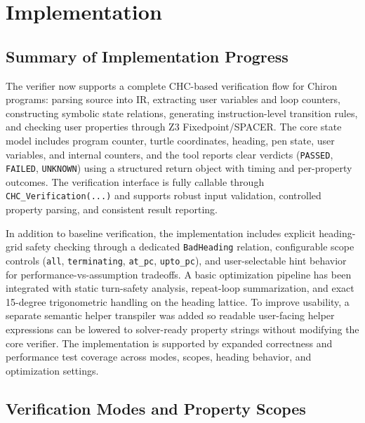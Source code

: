 \section*{Implementation}

\subsection*{Summary of Implementation Progress}
The verifier now supports a complete CHC-based verification flow for Chiron programs: parsing source into IR, extracting user variables and loop counters, constructing symbolic state relations, generating instruction-level transition rules, and checking user properties through Z3 Fixedpoint/SPACER. The core state model includes program counter, turtle coordinates, heading, pen state, user variables, and internal counters, and the tool reports clear verdicts (\texttt{PASSED}, \texttt{FAILED}, \texttt{UNKNOWN}) using a structured return object with timing and per-property outcomes. The verification interface is fully callable through \texttt{CHC\_Verification(...)} and supports robust input validation, controlled property parsing, and consistent result reporting.

In addition to baseline verification, the implementation includes explicit heading-grid safety checking through a dedicated \texttt{BadHeading} relation, configurable scope controls (\texttt{all}, \texttt{terminating}, \texttt{at\_pc}, \texttt{upto\_pc}), and user-selectable hint behavior for performance-vs-assumption tradeoffs. A basic optimization pipeline has been integrated with static turn-safety analysis, repeat-loop summarization, and exact 15-degree trigonometric handling on the heading lattice. To improve usability, a separate semantic helper transpiler was added so readable user-facing helper expressions can be lowered to solver-ready property strings without modifying the core verifier. The implementation is supported by expanded correctness and performance test coverage across modes, scopes, heading behavior, and optimization settings.

\subsection*{Verification Modes and Property Scopes}


